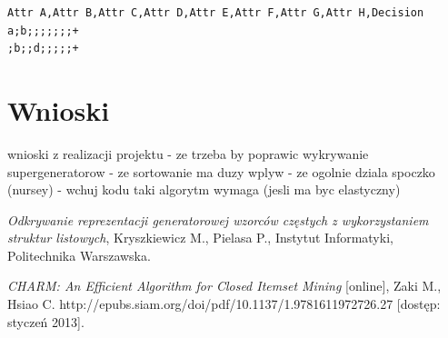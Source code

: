 \documentclass[a4paper,10pt]{article}
\begin{document}
\begin{verbatim}
Attr A,Attr B,Attr C,Attr D,Attr E,Attr F,Attr G,Attr H,Decision
a;b;;;;;;;+
;b;;d;;;;;+
\end{verbatim}



\section{Wnioski}
wnioski z realizacji projektu
- ze trzeba by poprawic wykrywanie supergeneratorow
- ze sortowanie ma duzy wplyw
- ze ogolnie dziala spoczko (nursey)
- wchuj kodu taki algorytm wymaga (jesli ma byc elastyczny)



\begin{thebibliography}{*}

  \emph{Odkrywanie reprezentacji generatorowej wzorców częstych z wykorzystaniem struktur listowych},
  Kryszkiewicz M., Pielasa P.,
  Instytut Informatyki,
  Politechnika Warszawska.

  \emph{CHARM: An Efficient Algorithm for Closed Itemset Mining} [online],
  Zaki M., Hsiao C.
  http://epubs.siam.org/doi/pdf/10.1137/1.9781611972726.27 [dostęp: styczeń 2013].

\end{thebibliography}
\end{document}
